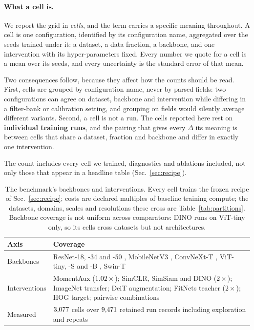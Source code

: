\paragraph{What a cell is.} We report the grid in \emph{cells}, and the term
carries a specific meaning throughout. A cell is one configuration, identified
by its configuration name, aggregated over the seeds trained under it: a
dataset, a data fraction, a backbone, and one intervention with its
hyper-parameters fixed. Every number we quote for a cell is a mean over its
seeds, and every uncertainty is the standard error of that mean.

Two consequences follow, because they affect how the counts should be read.
First, cells are grouped by configuration name, never by parsed fields:
two configurations can agree on dataset, backbone and intervention while
differing in a filter-bank or calibration setting, and grouping on
fields would silently average different variants. Second, a cell is
not a run. The \computeCells{} cells reported here rest on
\textbf{\computeRuns{} individual training runs}, and the pairing that gives
every $\Delta$ its meaning is between cells that share a dataset, fraction and
backbone and differ in exactly one intervention.

The count includes every cell we trained, diagnostics and ablations included,
not only those that appear in a headline table
(Sec.~\ref{sec:recipe}).

\begin{table}[pos=htbp]
\caption{The benchmark's backbones and interventions. Every cell trains the
frozen recipe of Sec.~\ref{sec:recipe}; costs are declared multiples of
baseline training compute; the datasets, domains, scales and resolutions
these cross are Table~\ref{tab:partitions}. Backbone coverage is not uniform
across comparators: DINO
runs on ViT-tiny only, so its cells cross datasets but not architectures.}
\label{tab:glance}
\centering\scriptsize
\setlength{\tabcolsep}{2.6pt}
\begin{tabularx}{\columnwidth}{@{}lX@{}}
\toprule
\textbf{Axis} & \textbf{Coverage} \\
\midrule
Backbones & ResNet-18, -34 and -50 \citep{he2016resnet}, MobileNetV3
  \citep{howard2019mobilenetv3}, ConvNeXt-T \citep{liu2022convnext},
  ViT-tiny, -S and -B \citep{dosovitskiy2021vit}, Swin-T
  \citep{liu2021swin} \\
Interventions & MomentAux ($1.02\times$); SimCLR, SimSiam and DINO
  ($2\times$); ImageNet transfer; DeiT augmentation; FitNets teacher
  ($2\times$); HOG target; pairwise combinations \\
Measured & $3{,}077$ cells over $9{,}471$ retained run records
  including exploration and repeats \\
\bottomrule
\end{tabularx}
\end{table}

